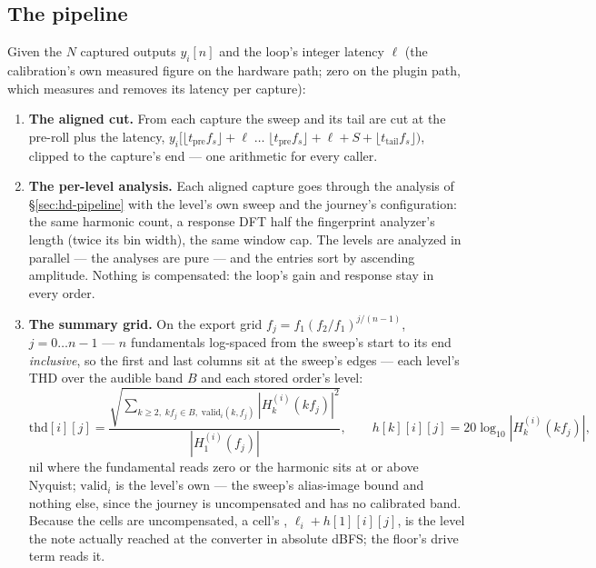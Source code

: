 \documentclass[11pt,a4paper]{article}
\begin{document}
\subsection{The pipeline}
\label{sec:journey-pipeline}
Given the $N$ captured outputs $y_i[n]$ and the loop's integer latency
$\ell$ (the calibration's own measured figure on the hardware path; zero
on the plugin path, which measures and removes its latency per capture):
{\sloppy
\begin{enumerate}
\item \textbf{The aligned cut.} From each capture the sweep and its tail
are cut at the pre-roll plus the latency,
$y_i[\lfloor t_{\mathrm{pre}} f_s\rfloor + \ell \;\ldots\; \lfloor t_{\mathrm{pre}} f_s\rfloor + \ell + S + \lfloor t_{\mathrm{tail}} f_s\rfloor)$,
clipped to the capture's end --- one arithmetic for every caller.

\item \textbf{The per-level analysis.} Each aligned capture goes through
the analysis of \S\ref{sec:hd-pipeline} with the level's own sweep and the
journey's configuration: the same harmonic count, a response DFT half the
fingerprint analyzer's length (twice its bin width), the same window cap.
The levels are analyzed in parallel --- the analyses are pure --- and the
entries sort by ascending amplitude. Nothing is compensated: the loop's
gain and response stay in every order.

\item \textbf{The summary grid.} On the export grid
$f_j = f_1 (f_2/f_1)^{j/(n-1)}$, $j = 0 \ldots n-1$ --- $n$ fundamentals
log-spaced from the sweep's start to its end \emph{inclusive}, so the
first and last columns sit at the sweep's edges --- each level's THD over
the audible band $B$ and each stored order's level:
\begin{equation}
  \mathrm{thd}[i][j] = \frac{\sqrt{\sum_{k \ge 2,\; k f_j \in B,\; \mathrm{valid}_i(k, f_j)} |H^{(i)}_k(k f_j)|^2}}{|H^{(i)}_1(f_j)|},
  \qquad
  h[k][i][j] = 20\log_{10}|H^{(i)}_k(k f_j)|,
  \label{eq:journeycells}
\end{equation}
nil where the fundamental reads zero or the harmonic sits at or above
Nyquist; $\mathrm{valid}_i$ is the level's own  ---
the sweep's alias-image bound and nothing else, since the journey is
uncompensated and has no calibrated band. Because the cells are
uncompensated, a cell's , $\ell_i + h[1][i][j]$,
is the level the note actually reached at the converter in absolute
dBFS; the floor's drive term reads it.


\end{enumerate}}
\end{document}
